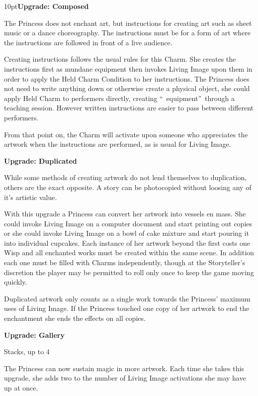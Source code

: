 \begin{myindentpar}{10pt}\textbf{Upgrade: Composed}

The Princess does not enchant art, but instructions for creating art such as sheet music or a dance choreography. The instructions must be for a form of art where the instructions are followed in front of a live audience. 

Creating instructions follows the usual rules for this Charm. She creates the instructions first as mundane equipment then invokes Living Image upon them in order to apply the Held Charm Condition to her instructions. The Princess does not need to write anything down or otherwise create a physical object, she could apply Held Charm to performers directly, creating \textquotedblleft\, equipment\textquotedblright\, through a teaching session. However written instructions are easier to pass between different performers. 

From that point on, the Charm will activate upon someone who appreciates the artwork when the instructions are performed, as is usual for Living Image.    

\textbf{Upgrade: Duplicated}

While some methods of creating artwork do not lend themselves to duplication, others are the exact opposite. A story can be photocopied without loosing any of it's artistic value. 

With this upgrade a Princess can convert her artwork into vessels en mass. She could invoke Living Image on a computer document and start printing out copies or she could invoke Living Image on a bowl of cake mixture and start pouring it into individual cupcakes. Each instance of her artwork beyond the first costs one Wisp and all enchanted works must be created within the same scene. In addition each one must be filled with Charms independently, though at the Storyteller's discretion the player may be permitted to roll only once to keep the game moving quickly.

Duplicated artwork only counts as a single work towards the Princess' maximum uses of Living Image. If the Princess touched one copy of her artwork to end the enchantment she ends the effects on all copies. 

\textbf{Upgrade: Gallery}

Stacks, up to 4

The Princess can now sustain magic in more artwork. Each time she takes this upgrade, she adds two to the number of Living Image activations she may have up at once.


\end{myindentpar}
